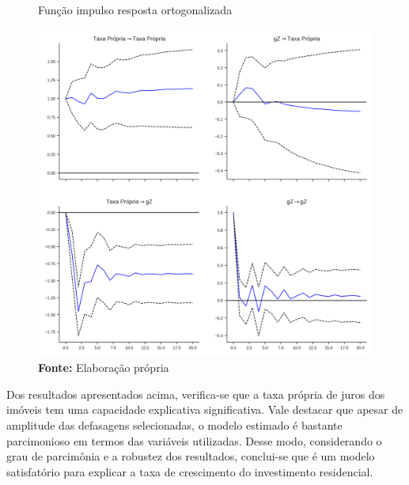 \begin{figure}[H]
	\centering
	\caption{Função impulso resposta ortogonalizada}
	\label{fevd}
	\includegraphics[width=\textwidth]{../../Modelo/SeriesTemporais/figs/Impulso_VECM.png}
	\caption*{\textbf{Fonte:} Elaboração própria}
\end{figure}

Dos resultados apresentados acima, verifica-se que a taxa própria de juros dos imóveis tem uma capacidade explicativa significativa. Vale destacar que apesar de amplitude das defasagens selecionadas, o modelo estimado é bastante parcimonioso em termos das variáveis utilizadas. Desse modo, considerando o grau de parcimônia e a robustez dos resultados, conclui-se que é um modelo satisfatório para explicar a taxa de crescimento do investimento residencial. 


